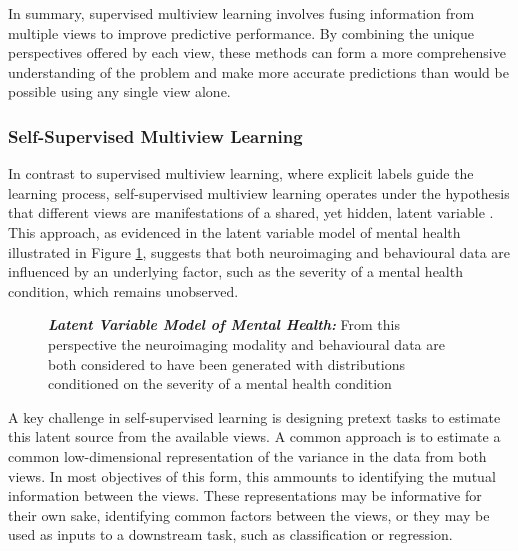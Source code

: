 In summary, supervised multiview learning involves fusing information from multiple views to improve predictive performance. By combining the unique perspectives offered by each view, these methods can form a more comprehensive understanding of the problem and make more accurate predictions than would be possible using any single view alone.

\subsubsection{Self-Supervised Multiview Learning}

In contrast to supervised multiview learning, where explicit labels guide the learning process, self-supervised multiview learning operates under the hypothesis that different views are manifestations of a shared, yet hidden, latent variable \citep{zong2023self}.
This approach, as evidenced in the latent variable model of mental health illustrated in Figure \ref{fig:mentalhealthselfsupervised}, suggests that both neuroimaging and behavioural data are influenced by an underlying factor, such as the severity of a mental health condition, which remains unobserved.

\begin{figure}
    \centering
    \caption[Latent Variable Model of Mental Health]{\textit{\textbf{Latent Variable Model of Mental Health:}} From this perspective the neuroimaging modality and behavioural data are both considered to have been generated with distributions conditioned on the severity of a mental health condition}\label{fig:mentalhealthselfsupervised}
\end{figure}

A key challenge in self-supervised learning is designing pretext tasks to estimate this latent source from the available views.
A common approach is to estimate a common low-dimensional representation of the variance in the data from both \gls{views}.
In most objectives of this form, this ammounts to identifying the mutual information between the \gls{views}.
These representations may be informative for their own sake, identifying common factors between the \gls{views}, or they may be used as inputs to a downstream task, such as classification or regression.


